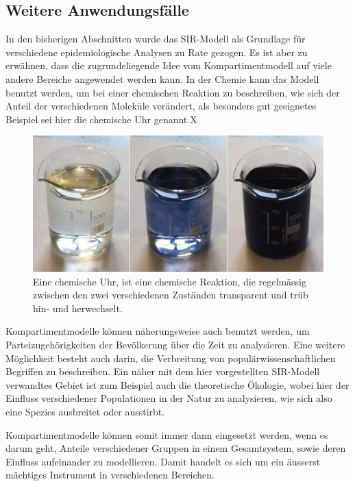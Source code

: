 \begin{refsection}
\section{Weitere Anwendungsfälle}
In den bisherigen Abschnitten wurde das SIR-Modell als Grundlage für verschiedene epidemiologische Analysen zu Rate gezogen.
Es ist aber zu erwähnen, dass die zugrundeliegende Idee vom Kompartimentmodell auf viele andere Bereiche angewendet werden kann.
In der Chemie kann das Modell benutzt werden, um bei einer chemischen Reaktion zu beschreiben, wie sich der Anteil der verschiedenen Moleküle verändert, als besonders gut geeignetes Beispiel sei hier die chemische Uhr genannt.X
\begin{figure}[h]
	\centering
	\includegraphics[width=.8\textwidth]{sir/images/chemical_clock}
  \caption[Chemische Uhr]{Eine chemische Uhr, ist eine chemische Reaktion, die regelmässig zwischen den zwei verschiedenen Zuständen transparent und trüb hin- und herwechselt.\cite{sir:chemical_clock}}
\end{figure}

Kompartimentmodelle können näherungsweise auch benutzt werden, um Parteizugehörigkeiten der Bevölkerung über die Zeit zu analysieren. 
Eine weitere Möglichkeit besteht auch darin, die Verbreitung von populärwissenschaftlichen Begriffen zu beschreiben. 
Ein näher mit dem hier vorgestellten SIR-Modell verwandtes Gebiet ist zum Beispiel auch die theoretische Ökologie, wobei hier der Einfluss verschiedener Populationen in der Natur zu analysieren, wie sich also eine Spezies ausbreitet oder ausstirbt.

Kompartimentmodelle können somit immer dann eingesetzt werden, wenn es darum geht, Anteile verschiedener Gruppen in einem Gesamtsystem, sowie deren Einfluss aufeinander zu modellieren. 
Damit handelt es sich um ein äusserst mächtiges Instrument in verschiedenen Bereichen. 


\printbibliography[heading=subbibliography]
\end{refsection}

